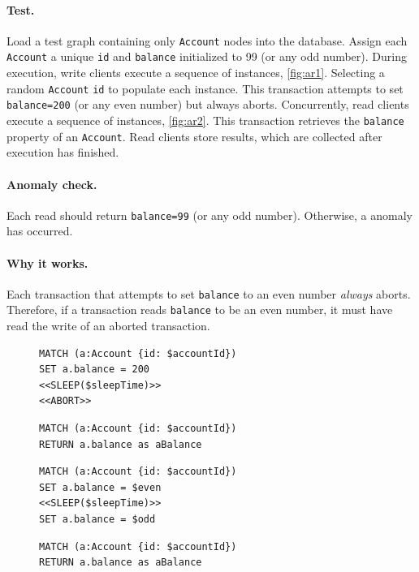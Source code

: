 \paragraph{Test.}
Load a test graph containing only \texttt{Account} nodes into the database.
Assign each \texttt{Account} a unique \texttt{id} and \texttt{balance} 
initialized to 99 (or any odd number). During execution, write clients execute
a sequence of  instances, \autoref{fig:ar1}. Selecting a 
random \texttt{Account} \texttt{id} to populate each instance. This transaction 
attempts to set \texttt{balance=200} (or any even number) but always aborts. 
Concurrently, read clients execute a sequence of  
instances, \autoref{fig:ar2}. This transaction retrieves the \texttt{balance} 
property of an \texttt{Account}. Read clients store results, which are collected 
after execution has finished.

\paragraph{Anomaly check.}
Each read should return \texttt{balance=99} (or any odd number). Otherwise, a 
 anomaly has occurred.

\paragraph{Why it works.}
Each transaction that attempts to set \texttt{balance} to an even number 
\emph{always} aborts. Therefore, if a transaction reads \texttt{balance} to be 
an even number, it must have read the write of an aborted transaction.

\begin{figure}[htb]
\centering
\begin{minipage}{0.45\linewidth}
\begin{lstlisting}[language=cypher,label=fig:ar1,caption=\tx{Aborted Read (G1a) $T_\mathrm{W}$}.]
MATCH (a:Account {id: $accountId})
SET a.balance = 200
<<SLEEP($sleepTime)>>
<<ABORT>>
\end{lstlisting}

\begin{lstlisting}[language=cypher,label=fig:ar2,caption=\tx{Aborted Read (G1a) $T_\mathrm{R}$}.]
MATCH (a:Account {id: $accountId})
RETURN a.balance as aBalance
\end{lstlisting}
\end{minipage}
%
\quad
%
\begin{minipage}{0.45\linewidth}
\begin{lstlisting}[language=cypher,label=fig:ir1,caption=\tx{Interm. Read (G1b) $T_\mathrm{W}$}.]
MATCH (a:Account {id: $accountId})
SET a.balance = $even
<<SLEEP($sleepTime)>>
SET a.balance = $odd
\end{lstlisting}

\begin{lstlisting}[language=cypher,label=fig:ir2,caption=\tx{Interm. Read (G1b) $T_\mathrm{R}$}.]
MATCH (a:Account {id: $accountId})
RETURN a.balance as aBalance
\end{lstlisting}
\end{minipage}
\end{figure}

